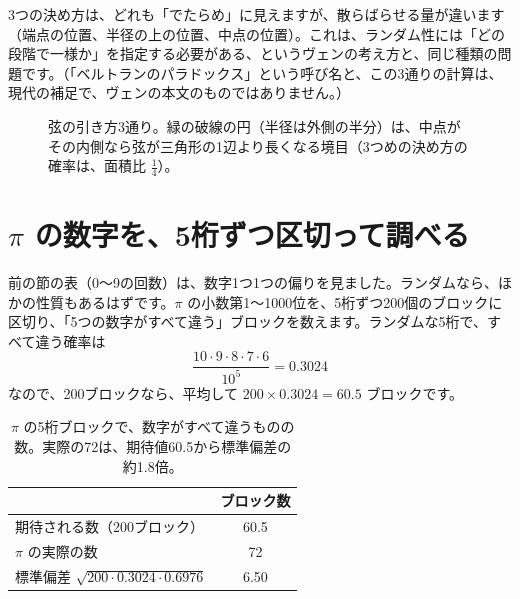 \documentclass[a4paper,11pt,openany]{ltjsbook}
\begin{document}
3つの決め方は、どれも「でたらめ」に見えますが、散らばらせる量が違います（端点の位置、半径の上の位置、中点の位置）。これは、ランダム性には「どの段階で一様か」を指定する必要がある、というヴェンの考え方と、同じ種類の問題です。（「ベルトランのパラドックス」という呼び名と、この3通りの計算は、現代の補足で、ヴェンの本文のものではありません。）

\begin{figure}[htbp]
\centering
{}
\caption{弦の引き方3通り。緑の破線の円（半径は外側の半分）は、中点がその内側なら弦が三角形の1辺より長くなる境目（3つめの決め方の確率は、面積比 $\tfrac14$）。}
\end{figure}

\section{$\pi$ の数字を、5桁ずつ区切って調べる}

前の節の表（0〜9の回数）は、数字1つ1つの偏りを見ました。ランダムなら、ほかの性質もあるはずです。$\pi$ の小数第1〜1000位を、5桁ずつ200個のブロックに区切り、「5つの数字がすべて違う」ブロックを数えます。ランダムな5桁で、すべて違う確率は
\[
\frac{10\cdot9\cdot8\cdot7\cdot6}{10^5}=0.3024
\]
なので、200ブロックなら、平均して $200\times0.3024=60.5$ ブロックです。

\begin{table}[htbp]
\centering
\begin{tabular}{lc}
\toprule
 & ブロック数\\
\midrule
期待される数（200ブロック） & 60.5\\
$\pi$ の実際の数 & 72\\
標準偏差 $\sqrt{200\cdot0.3024\cdot0.6976}$ & 6.50\\
\bottomrule
\end{tabular}
\caption{$\pi$ の5桁ブロックで、数字がすべて違うものの数。実際の72は、期待値60.5から標準偏差の約1.8倍。}
\end{table}
\end{document}
